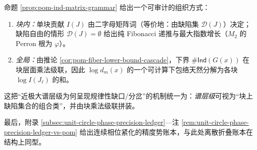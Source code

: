 \begin{remark}[谱层级的缺陷集分类原则]\label{rem:pom-ind-defect-class}
命题 \ref{prop:pom-ind-matrix-grammar} 给出一个可审计的组织方式：
\begin{enumerate}
  \item \emph{块内：}单块贡献 $I(J)$ 由二字母矩阵词（等价地：由缺陷集 $\mathcal D(J)$）决定；缺陷自由的情形 $\mathcal D(J)=\emptyset$ 给出纯 Fibonacci 递推与最大指数增长（$M_2$ 的 Perron 根为 $\varphi$）。
  \item \emph{全局：}由推论 \ref{cor:pom-fiber-lower-bound-cascade}，下界 $\#\mathsf{Ind}(G(x))$ 在块层面乘法级联，因此 $\log d_m(x)$ 的一个可计算下包络天然分解为各块 $\log I(J_\ell)$ 的和。
\end{enumerate}
这把“近极大谱层级为何呈现规律性缺口/分岔”的机制统一为：\emph{谱层级}可视为“块上缺陷集合的组合类”，并由块乘法级联拼装。
\end{remark}
最后，附录 \ref{subsec:unit-circle-phase-precision-ledger}—注 \ref{rem:unit-circle-phase-precision-ledger-vs-pom} 给出连续相位紧化的精度势账本，与此处离散折叠账本在结构上同型。
